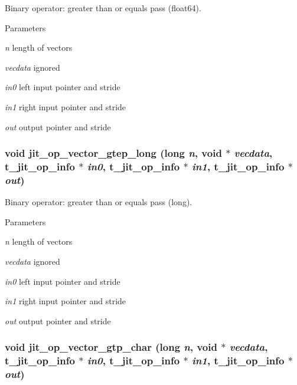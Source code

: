 Binary operator: greater than or equals pass (float64). 
\begin{DoxyParams}{Parameters}
\item[{\em n}]length of vectors \item[{\em vecdata}]ignored \item[{\em in0}]left input pointer and stride \item[{\em in1}]right input pointer and stride \item[{\em out}]output pointer and stride \end{DoxyParams}
\hypertarget{group__opvecmod_ga0c242c1894814e6026aba91f82f88ba8}{
\subsubsection[{jit\_\-op\_\-vector\_\-gtep\_\-long}]{\setlength{\rightskip}{0pt plus 5cm}void jit\_\-op\_\-vector\_\-gtep\_\-long (long {\em n}, \/  void $\ast$ {\em vecdata}, \/  {\bf t\_\-jit\_\-op\_\-info} $\ast$ {\em in0}, \/  {\bf t\_\-jit\_\-op\_\-info} $\ast$ {\em in1}, \/  {\bf t\_\-jit\_\-op\_\-info} $\ast$ {\em out})}}
\label{group__opvecmod_ga0c242c1894814e6026aba91f82f88ba8}


Binary operator: greater than or equals pass (long). 
\begin{DoxyParams}{Parameters}
\item[{\em n}]length of vectors \item[{\em vecdata}]ignored \item[{\em in0}]left input pointer and stride \item[{\em in1}]right input pointer and stride \item[{\em out}]output pointer and stride \end{DoxyParams}
\hypertarget{group__opvecmod_ga7ecdd3b9dfb769c315b26123622f058c}{
\subsubsection[{jit\_\-op\_\-vector\_\-gtp\_\-char}]{\setlength{\rightskip}{0pt plus 5cm}void jit\_\-op\_\-vector\_\-gtp\_\-char (long {\em n}, \/  void $\ast$ {\em vecdata}, \/  {\bf t\_\-jit\_\-op\_\-info} $\ast$ {\em in0}, \/  {\bf t\_\-jit\_\-op\_\-info} $\ast$ {\em in1}, \/  {\bf t\_\-jit\_\-op\_\-info} $\ast$ {\em out})}}
\label{group__opvecmod_ga7ecdd3b9dfb769c315b26123622f058c}


